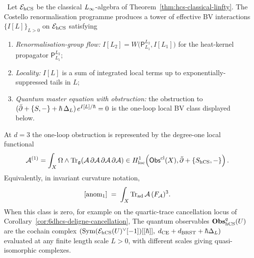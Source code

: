 \begin{theorem}
\label{thm:hcs-QME-one-loop}
%
\ClaimStatusProvedElsewhere\,\cite{CostelloRenormalization,CostelloGwilliam2021}
Let $\mathcal{E}_{\mathrm{hCS}}$ be the classical $L_\infty$-algebra of
Theorem~\ref{thm:hcs-classical-linfty}. The Costello
renormalisation programme produces a tower of effective
BV interactions $\{I[L]\}_{L>0}$ on $\mathcal{E}_{\mathrm{hCS}}$ satisfying
\begin{enumerate}[label=\textup{(\roman*)}]
 \item \emph{Renormalisation-group flow:}
 $I[L_2] = W\bigl(\mathsf{P}_{L_1}^{L_2},I[L_1]\bigr)$ for the heat-kernel
 propagator $\mathsf{P}_{L_1}^{L_2}$;
 \item \emph{Locality:} $I[L]$ is a sum of integrated local terms
 up to exponentially-suppressed tails in $L$;
 \item \emph{Quantum master equation with obstruction:}
 the obstruction to
 $(\bar\partial+\{S,-\}+\hbar\,\Delta_L)\,e^{I[L]/\hbar}=0$ is the
 one-loop local BV class displayed below.
\end{enumerate}
At $d=3$ the one-loop obstruction is represented by the degree-one
local functional
\begin{equation}
\label{eq:hcs-local-one-loop-anomaly}
 \mathcal A^{(1)}
 =
 \int_X \Omega\wedge
 \mathrm{Tr}_{\mathfrak{g}}\!\left(\mathcal{A}\,\partial\mathcal{A}\,\partial\mathcal{A}\,\partial\mathcal{A}\right)
 \in
 H^1_{\mathrm{loc}}\!\left(
 \mathsf{Obs}^{\mathrm{cl}}(X),\bar\partial+\{S_{\mathrm{hCS}},-\}
 \right).
\end{equation}
Equivalently, in invariant curvature notation,
\begin{equation}
\label{eq:hcs-quartic-anomaly}
 [\mathrm{anom}_1]
 \;=\; \int_X \mathrm{Tr}_{\mathrm{ad}}\,\mathcal{A}\,(F_{\mathcal{A}})^3.
\end{equation}
When this class is zero, for example on the quartic-trace
cancellation locus of Corollary~\ref{cor:6dhcs-deligne-cancellation},
The quantum observables $\mathbf{Obs}^{q}_{\mathrm{hCS}}(U)$ are the cochain complex
$(\mathrm{Sym}(\mathcal{E}_{\mathrm{hCS}}(U)^\vee[-1])[[\hbar]],\;d_{\mathrm{CE}}+d_{\mathrm{BRST}}
+\hbar\Delta_L)$ evaluated at any
finite length scale $L > 0$, with different scales giving
quasi-isomorphic complexes.
\end{theorem}

